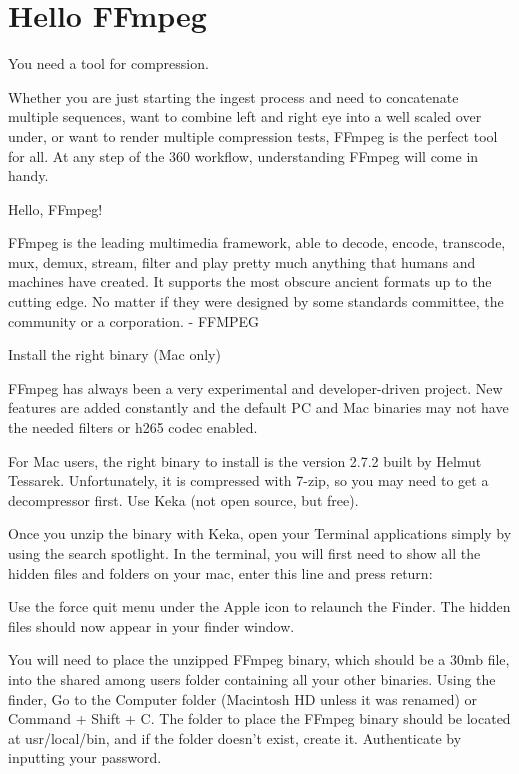 \chapter{Hello FFmpeg}
\pagecolor{white}
\label{chap:56}
\begin{fullwidth}

\problem

{\large You need a tool for compression. \par}

Whether you are just starting the ingest process and need to concatenate multiple sequences, want to combine left and right eye into a well scaled over under, or want to render multiple compression tests, FFmpeg is the perfect tool for all. At any step of the 360 workflow, understanding FFmpeg will come in handy.

\solutions

{\large Hello, FFmpeg! \par}

FFmpeg is the leading multimedia framework, able to decode, encode, transcode, mux, demux, stream, filter and play pretty much anything that humans and machines have created. It supports the most obscure ancient formats up to the cutting edge. No matter if they were designed by some standards committee, the community or a corporation. - FFMPEG

{\large Install the right binary (Mac only) \par}

FFmpeg has always been a very experimental and developer-driven project. New features are added constantly and the default PC and Mac binaries may not have the needed filters or h265 codec enabled. 

For Mac users, the right binary to install is the version 2.7.2 built by Helmut Tessarek. Unfortunately, it is compressed with 7-zip, so you may need to get a decompressor first. Use Keka (not open source, but free).

Once you unzip the binary with Keka, open your Terminal applications simply by using the search spotlight. In the terminal, you will first need to show all the hidden files and folders on your mac, enter this line and press return:


Use the force quit menu under the Apple icon to relaunch the Finder. The hidden files should now appear in your finder window. 

You will need to place the unzipped FFmpeg binary, which should be a 30mb file, into the shared among users folder containing all your other binaries. Using the finder, Go to the Computer folder (Macintosh HD unless it was renamed) or Command + Shift + C. The folder to place the FFmpeg binary should be located at usr/local/bin, and if the folder doesn’t exist, create it. Authenticate by inputting your password. 


\end{fullwidth}
